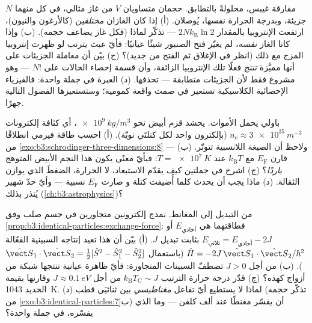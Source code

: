 \begin{exercise}[$\star\star\star$]\label{exo:b3:identical-particles:10}
مفارقة غيبس، محلولةً بالتطابق. حجمان متساويان $V$ من
غاز مثالي، في كل منهما $N$ جزيئة، وبدرجة الحرارة نفسها، يُوصلان. (أ) إذا
كان الغازان \emph{مختلفين} (كالأرغون والنيون)، ارتفعت الإنتروبيا
بالمقدار $2Nk_{\text{B}}\ln2$ --- تذكّر لماذا (فكل غاز يضاعف
حجمه). (ب) وإذا كانا الغاز \emph{نفسه}، لم يغيّر فتح الصنبور
شيئًا عيانيًا: فأيّ عبث يترتب لو ظهرت إنتروبيا
المزج مع ذلك (انظر في الإغلاق ثم الفتح من جديد)؟
(ج) بيّن أن معاملة الجزيئات على أنها مميَّزة \emph{تنتج}
فعلًا تلك الإنتروبيا الزائفة، وأن قسمة إحصاء
الحالات على $N!$ --- وهو مشروع فقط لأن الجزيئات
متطابقة --- تحذفها. (د) العبرة في جملة واحدة:
فالفيزياء الإحصائية الكلاسيكية تستعير في صمت واقعة كمومية؛
وستستعيرها الفصول التالية جهرًا.
\end{exercise}

\begin{exercise}[$\star\star\star$]\label{exo:b3:identical-particles:11}
باولي يحمل الأموات. يحشد قزم أبيض نحو
$\qty{e9}{kg/m^3}$، أي كثافة إلكترونات $n_{\text{e}} \approx
\qty{3e35}{m^{-3}}$ (بإلكترون واحد لكل كتلتَي نويّة). (أ)
احسب طاقة فيرمي انطلاقًا من
\cref{exo:b3:schrodinger-three-dimensions:8}
--- ولاحظ أن الصيغة اللانسبية تتوتّر. (ب) قارن
$E_{\text{F}}$ مع $k_{\text{B}}T$ عند $T = \qty{e7}{K}$: فبأيّ
معنًى يكون هذا النجم الأبيض المتوهج \emph{باردًا}؟ (ج) اشرح في
جملتين كيف يقدّم الاستبعاد، لا الحرارة، الضغطَ الذي
يوازن الثقالة. (د) ماذا يجب أن يحدث كلما أُضيفت كتلة و
صارت $E_{\text{F}}$ نسبية --- وأيّ حدّ شهير يُنذر بذلك
(\cref{ch:b3:astrophysics})؟
\end{exercise}

\begin{exercise}[$\star\star\star$]\label{exo:b3:identical-particles:12}
من التبديل إلى المغانط. نمذج إلكترونين متجاورين في
جسم صلب وفق \cref{prop:b3:identical-particles:exchange-force}: فطاقتهما
هي $E_{\text{أحادي}}$ أو $E_{\text{ثلاثي}} =
E_{\text{أحادي}} - 2J$ بثابت تبديل $J$. (أ) بيّن أن هذا
تعيد إنتاجه  السبينية الفعّالة $\hat H =
-2J\,\hat{\vect S}_1\cdot\hat{\vect S}_2/\hbar^2$ (باستعمال
$\hat{\vect S}_1\cdot\hat{\vect S}_2 = \tfrac12[\hat S^2 - \hat
S_1^2 - \hat S_2^2]$). (ب) من أجل $J > 0$ تصطفّ السبينات المتجاورة:
فأيّ ظاهرة عيانية تنتجها شبكة من أزواج كهذه؟
(ج) قدّر درجة حرارة الترتيب $k_{\text{B}}T_{\text{C}}
\sim J$ من أجل $J \approx \qty{0.1}{eV}$ وقارنها بقيمة الحديد
\qty{1043}{K}. (د) لماذا لا يستطيع أيّ تفاعل \emph{مغناطيسي}
بين ثنائيَي قطب (تذكّر حجمه من
\cref{exo:b3:identical-particles:7}ب) أن يفسّر مغنطًا عند ألف
كلفن --- وما الذي يفسّره، في جملة واحدة؟
\end{exercise}

